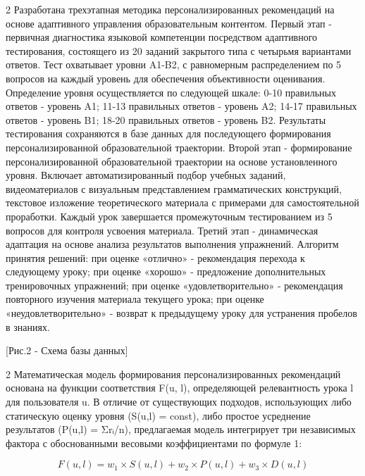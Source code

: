 \begin{multicols}{2}
Разработана трехэтапная методика персонализированных рекомендаций на
основе адаптивного управления образовательным контентом. Первый этап -
первичная диагностика языковой компетенции посредством адаптивного
тестирования, состоящего из 20 заданий закрытого типа с четырьмя
вариантами ответов. Тест охватывает уровни A1-B2, с равномерным
распределением по 5 вопросов на каждый уровень для обеспечения
объективности оценивания. Определение уровня осуществляется по следующей
шкале: 0-10 правильных ответов - уровень A1; 11-13 правильных ответов -
уровень A2; 14-17 правильных ответов - уровень B1; 18-20 правильных
ответов - уровень B2. Результаты тестирования сохраняются в базе данных
для последующего формирования персонализированной образовательной
траектории. Второй этап - формирование персонализированной
образовательной траектории на основе установленного уровня. Включает
автоматизированный подбор учебных заданий, видеоматериалов с визуальным
представлением грамматических конструкций, текстовое изложение
теоретического материала с примерами для самостоятельной проработки.
Каждый урок завершается промежуточным тестированием из 5 вопросов для
контроля усвоения материала. Третий этап - динамическая адаптация на
основе анализа результатов выполнения упражнений. Алгоритм принятия
решений: при оценке «отлично» - рекомендация перехода к следующему
уроку; при оценке «хорошо» - предложение дополнительных тренировочных
упражнений; при оценке «удовлетворительно» - рекомендация повторного
изучения материала текущего урока; при оценке «неудовлетворительно» -
возврат к предыдущему уроку для устранения пробелов в знаниях.
\end{multicols}

[Рис.2 - Схема базы данных]

\begin{multicols}{2}
Математическая модель формирования персонализированных рекомендаций
основана на функции соответствия F(u, l), определяющей релевантность
урока l для пользователя u. В отличие от существующих подходов,
использующих либо статическую оценку уровня (S(u,l) = const), либо
простое усреднение результатов (P(u,l) = Σrᵢ/n), предлагаемая модель
интегрирует три независимых фактора с обоснованными весовыми
коэффициентами по формуле 1:

\end{multicols}

\begin{equation}
F(u, l) = w_{1}\times S(u, l) + w_{2}\times P(u, l) + w_{3}\times D(u, l)
\end{equation}

